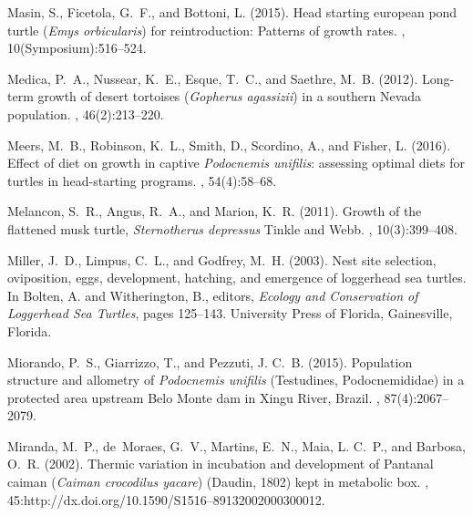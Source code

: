 \documentclass{article}
\begin{document}
\begin{thebibliography}{}
Masin, S., Ficetola, G.~F., and Bottoni, L. (2015).
\newblock Head starting european pond turtle (\emph{Emys orbicularis}) for
  reintroduction: Patterns of growth rates.
,
  10(Symposium):516--524.

Medica, P.~A., Nussear, K.~E., Esque, T.~C., and Saethre, M.~B. (2012).
\newblock Long-term growth of desert tortoises (\emph{Gopherus agassizii}) in a
  southern {N}evada population.
, 46(2):213--220.

Meers, M.~B., Robinson, K.~L., Smith, D., Scordino, A., and Fisher, L. (2016).
\newblock Effect of diet on growth in captive \emph{Podocnemis unifilis}:
  assessing optimal diets for turtles in head-starting programs.
, 54(4):58--68.

Melancon, S.~R., Angus, R.~A., and Marion, K.~R. (2011).
\newblock Growth of the flattened musk turtle, \emph{Sternotherus depressus}
  {T}inkle and {W}ebb.
, 10(3):399--408.

Miller, J.~D., Limpus, C.~L., and Godfrey, M.~H. (2003).
\newblock Nest site selection, oviposition, eggs, development, hatching, and
  emergence of loggerhead sea turtles.
\newblock In Bolten, A. and Witherington, B., editors, {\em Ecology and
  Conservation of Loggerhead Sea Turtles}, pages 125--143. University Press of
  Florida, Gainesville, Florida.

Miorando, P.~S., Giarrizzo, T., and Pezzuti, J. C.~B. (2015).
\newblock Population structure and allometry of \emph{Podocnemis unifilis}
  ({T}estudines, {P}odocnemididae) in a protected area upstream {B}elo {M}onte
  dam in {X}ingu {R}iver, {B}razil.
, 87(4):2067--2079.

Miranda, M.~P., de~Moraes, G.~V., Martins, E.~N., Maia, L. C.~P., and Barbosa,
  O.~R. (2002).
\newblock Thermic variation in incubation and development of {P}antanal caiman
  (\emph{Caiman crocodilus yacare}) ({D}audin, 1802) kept in metabolic box.
,
  45:http://dx.doi.org/10.1590/S1516--89132002000300012.


\end{thebibliography}
\end{document}

